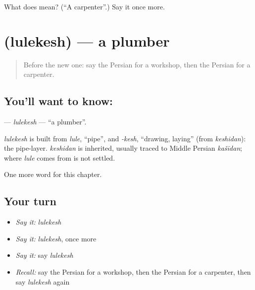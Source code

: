 \begin{tcolorbox}[breakable,colback=teal!4,colframe=teal!35!black,title={Before you move on}]
What does  mean? (\textquotedblleft{}A carpenter\textquotedblright{}.) Say it once more.
\end{tcolorbox}
\section[\texorpdfstring{\fa{لوله} \fa{کش} (lulekesh)}{لوله کش (lulekesh)}]{  (lulekesh) — a plumber}

\label{lesson:FA-C216-lulekesh}



\begin{quote}
Before the new one: say the Persian for a workshop, then the Persian for a carpenter.
\end{quote}

\subsection*{You'll want to know:  }
\textbf{ } — \emph{lulekesh} — \textquotedblleft{}a plumber\textquotedblright{}.

\begin{cousinweb}
\emph{lulekesh} is built from \emph{lule}, \textquotedblleft{}pipe\textquotedblright{}, and \emph{-kesh}, \textquotedblleft{}drawing, laying\textquotedblright{} (from \emph{keshidan}): the pipe-layer. \emph{keshidan} is inherited, usually traced to Middle Persian \emph{kašīdan}; where \emph{lule} comes from is not settled.
\end{cousinweb}

\begin{grammarlens}[title={What you've built}]
One more word for this chapter.
\end{grammarlens}

\subsection*{Your turn}
\begin{itemize}
\raggedright
  \item \emph{Say it:} \emph{lulekesh}
  \item \emph{Say it:} \emph{lulekesh}, once more
  \item \emph{Say it:} say \emph{lulekesh}
  \item \emph{Recall:} say the Persian for a workshop, then the Persian for a carpenter, then say \emph{lulekesh} again
\end{itemize}

